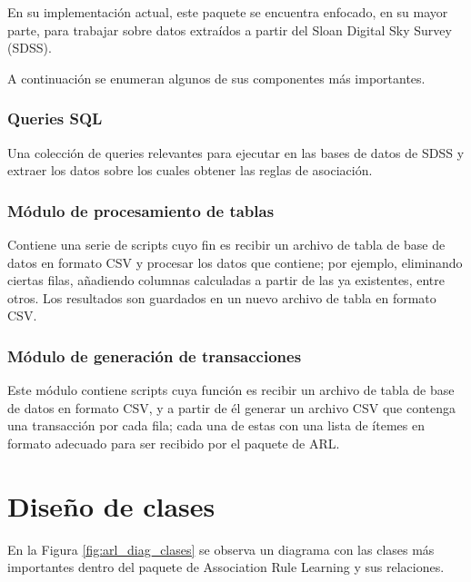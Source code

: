 En su implementación actual, este paquete se encuentra enfocado, en su mayor parte, para trabajar sobre datos extraídos a partir del Sloan Digital Sky Survey (SDSS).

A continuación se enumeran algunos de sus componentes más importantes.

\subsubsection{Queries SQL}

Una colección de queries relevantes para ejecutar en las bases de datos de SDSS y extraer los datos sobre los cuales obtener las reglas de asociación.

\subsubsection{Módulo de procesamiento de tablas}

Contiene una serie de scripts cuyo fin es recibir un archivo de tabla de base de datos en formato CSV y procesar los datos que contiene; por ejemplo, eliminando ciertas filas, añadiendo columnas calculadas a partir de las ya existentes, entre otros. Los resultados son guardados en un nuevo archivo de tabla en formato CSV.

\subsubsection{Módulo de generación de transacciones}

Este módulo contiene scripts cuya función es recibir un archivo de tabla de base de datos en formato CSV, y a partir de él generar un archivo CSV que contenga una transacción por cada fila; cada una de estas con una lista de ítemes en formato adecuado para ser recibido por el paquete de ARL.

\section{Diseño de clases}

En la Figura \ref{fig:arl_diag_clases} se observa un diagrama con las clases más importantes dentro del paquete de Association Rule Learning y sus relaciones.

